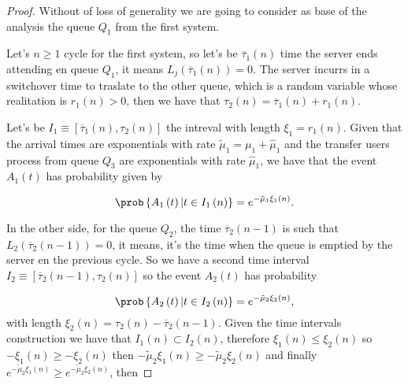 \begin{proof}

Without of loss of generality we are going to consider as base of the analysis the queue $Q_{1}$ from the first system.

Let's $n\geq1$ cycle for the first system, so let's be $\overline{\tau}_{1}\left(n\right)$ time the server ends attending en queue $Q_{1}$, it means 
$L_{j}\left(\overline{\tau}_{1}\left(n\right)\right)=0$. The server incurrs in a switchover time to traslate to the other queue, which is a random variable whose realitation is $r_{1}\left(n\right)>0$, then we have that $\tau_{2}\left(n\right)=\overline{\tau}_{1}\left(n\right)+r_{1}\left(n\right)$.

Let's be $I_{1}\equiv\left[\overline{\tau}_{1}\left(n\right),\tau_{2}\left(n\right)\right]$ the intreval with length $\xi_{1}=r_{1}\left(n\right)$. Given that the arrival times are exponentials with rate $\tilde{\mu}_{1}=\mu_{1}+\hat{\mu}_{1}$ and the transfer users process from queue $Q_{3}$ are exponentials with rate $\hat{\mu}_{1}$, we have that the event $A_{1}\left(t\right)$ has probability given by 

\begin{equation}
\prob\left\{A_{1}\left(t\right)|t\in I_{1}\left(n\right)\right\}=e^{-\tilde{\mu}_{1}\xi_{1}\left(n\right)}.
\end{equation} 

In the other side, for the queue $Q_{2}$, the time 
$\overline{\tau}_{2}\left(n-1\right)$ is such that 
$L_{2}\left(\overline{\tau}_{2}\left(n-1\right)\right)=0$, it means, it's the time when the queue is emptied by the server en the previous cycle. So we have a second time interval $I_{2}\equiv\left[\overline{\tau}_{2}\left(n-1\right),\tau_{2}\left(n\right)\right]$ so the event $A_{2}\left(t\right)$ has probability

\begin{equation}
\prob\left\{A_{2}\left(t\right)|t\in I_{2}\left(n\right)\right\}=e^{-\tilde{\mu}_{2}\xi_{2}\left(n\right)},
\end{equation} 
with length 
$\xi_{2}\left(n\right)=\tau_{2}\left(n\right)-\overline{\tau}_{2}\left(n-1\right)$. Given the time intervals construction we have that $I_{1}\left(n\right)\subset I_{2}\left(n\right)$, therefore  $\xi_{1}\left(n\right)\leq\xi_{2}\left(n\right)$ so $-\xi_{1}\left(n\right)\geq-\xi_{2}\left(n\right)$ then $-\tilde{\mu}_{2}\xi_{1}\left(n\right)\geq-\tilde{\mu}_{2}\xi_{2}\left(n\right)$ and finally $e^{-\tilde{\mu}_{2}\xi_{1}\left(n\right)}\geq e^{-\tilde{\mu}_{2}\xi_{2}\left(n\right)}$, then


\end{proof}
